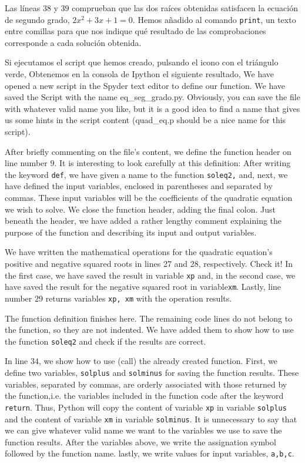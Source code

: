 \begin{paracol}{2}
     Las líneas $38$ y $39$ comprueban que las dos raíces obtenidas satisfacen la ecuación de segundo grado, $2x^2+3x+1 = 0$. Hemos añadido al comando \texttt{print}, un texto entre comillas para que nos indique qué resultado de las comprobaciones corresponde a cada solución obtenida.

     Si ejecutamos el script que hemos creado, pulsando el icono con el triángulo verde, Obtenemos en la consola de Ipython el siguiente resultado,
     \switchcolumn
     We have opened a new script in the Spyder text editor to define our function. We have saved the Script with the name {eq\_seg\_grado.py}. Obviously, you can save the file with whatever valid name you like, but it is a good idea to find a name that gives us some hints in the script content (quad\_eq.p should be a nice name for this script). 

     After briefly commenting on the file's content, we define the function header on line number $9$. It is interesting to look carefully at this definition: After writing the keyword \texttt{def}, we have given a name to the function \texttt{soleq2,} and, next, we have defined the input variables, enclosed in parentheses and separated by commas. These input variables will be the coefficients of the quadratic equation we wish to solve. We close the function header, adding the final colon. Just beneath the header, we have added a rather lengthy comment explaining the purpose of the function and describing its input and output variables.

     We have written the mathematical operations for the quadratic equation's positive and negative squared roots in lines 27 and 28, respectively. Check it! In the first case, we have saved the result in variable \texttt{xp} and, in the second case, we have saved the result for the negative squared root in variable\texttt{xm}. Lastly, line number $29$ returns variables \texttt{xp, xm} with the operation results.

     The function definition finishes here. The remaining code lines do not belong to the function, so they are not indented. We have added them to show how to use the function \texttt{soleq2} and check if the results are correct.

     In line $34$, we show how to use (call) the already created function. First, we define two variables, \texttt{solplus} and \texttt{solminus} for saving the function results.
     These variables, separated by commas, are orderly associated with those returned by the function,i.e. the variables included in the function code after the keyword \texttt{return}. Thus, Python will copy the content of variable \texttt{xp} in variable \texttt{solplus} and the content of variable \texttt{xm} in variable \texttt{solminus}. It is unnecessary to say that we can give whatever valid name we want to the variables we use to save the function results. After the variables above, we write the assignation symbol followed by the function name. lastly, we write values for input variables, \texttt{a,b,c}.


\end{paracol}
